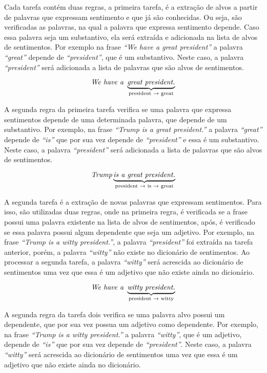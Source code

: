 Cada tarefa contém duas regras, a primeira tarefa, é a extração de alvos a
partir de palavras que expressam sentimento e que já são conhecidas. Ou seja, são verificadas as palavras, na qual a palavra que expressa sentimento depende. Caso
essa palavra seja um substantivo, ela será extraída e adicionada na lista de
alvos de sentimentos. Por exemplo na frase \textit{``We have a great
president''} a palavra \textit{``great''} depende de \textit{``president''}, que
é um substantivo. Neste caso, a palavra \textit{``president''} será adicionada a
lista de palavras que são alvos de sentimentos.

\[\textit{We have a } \underbrace{\textit{great president.}}_\text{president
\textrightarrow \text{ great}}\]

A segunda regra da primeira tarefa
verifica se uma palavra que expressa sentimentos depende de uma determinada
palavra, que depende de um substantivo. Por exemplo, na frase
\textit{``Trump is a great president.''} a palavra \textit{``great''} depende de
\textit{``is''} que por sua vez depende de \textit{``president''} e essa é um
substantivo. Neste caso, a palavra \textit{``president''} será
adicionada a lista de palavras que são alvos de sentimentos.

\[\textit{Trump} \underbrace{\textit{is a great president.}}_\text{president
\textrightarrow \text{ is} \textrightarrow \text{ great}}\]

A segunda tarefa é a extração de novas palavras que expressam sentimentos. Para isso, são utilizadas duas
regras, onde na primeira regra, é verificada se a frase possui
uma palavra existente na lista de alvos de sentimentos, após, é verificado se
essa palavra possui algum dependente que seja um adjetivo. Por exemplo, na frase
\textit{``Trump is a witty president.''}, a palavra \textit{``president''} foi
extraída na tarefa anterior, porém, a palavra \textit{``witty''} não existe no dicionário de
sentimentos. Ao processar a segunda tarefa, a palavra \textit{``witty''}
será acrescida ao dicionário de sentimentos uma vez que essa é um adjetivo que
não existe ainda no dicionário.


\[\textit{We have a } \underbrace{\textit{witty president.}}_\text{president
\textrightarrow \text{ witty}}\]

A segunda regra da tarefa dois
verifica se uma palavra alvo possui um dependente, que por sua vez possua um
adjetivo como dependente. Por exemplo, na frase
\textit{``Trump is a witty president.''} a palavra \textit{``witty''}, que é um
adjetivo, depende de \textit{``is''} que por sua vez depende de
\textit{``president''}. Neste caso, a palavra \textit{``witty''}
será acrescida ao dicionário de sentimentos uma vez que essa é um adjetivo que
não existe ainda no dicionário.

